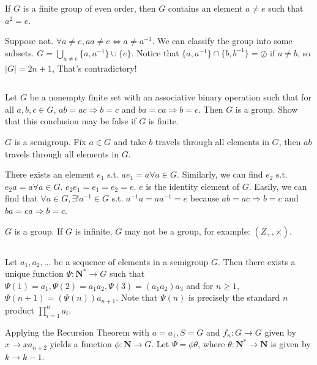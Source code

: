 $$ $$

\begin{ex}
    If $G$ is a finite group of even order, then $G$ contains an element $a\neq e$ such that $a^{2}=e$.
\end{ex}

\begin{answer}
    Suppose not. $\forall a\neq e, aa\neq e \Leftrightarrow a\neq a^{-1}$. We can classify the group into some subsets. $G=\bigcup\limits_{a\neq e}\{a,a^{-1}\}\cup\{e\}$. Notice that $\{a,a^{-1}\}\cap\{b,b^{-1}\}=\oslash$ if $a\neq b$, so $\left| G \right| =2n+1$, That's contradictory!
\end{answer}

$$ $$

\begin{ex}
    Let $G$ be a nonempty finite set with an associative binary operation such that for all $a, b, c\in G$, $ab = ac\Rightarrow b = c$ and $ba  =ca \Rightarrow b = c$. Then $G$ is a group. Show that this conclusion may be false if $G$ is finite.
\end{ex}

\begin{answer}
    $G$ is a semigroup. Fix $a\in G$ and take $b$ travels through all elements in $G$, then $ab$ travels through all elements in $G$.

    There exists an element $e_1$ s.t. $ae_1=a\forall a\in G$. Similarly, we can find $e_2$ s.t. $e_2a=a\forall a\in G$. $e_2e_1=e_1=e_2=e$. $e$ is the identity element of $G$. Easily, we can find that $\forall a\in G, \exists ! a^{-1}\in G$ s.t. $a^{-1}a=aa^{-1}=e$ because $ab = ac\Rightarrow b = c$ and $ba  =ca \Rightarrow b = c$.

    $G$ is a group. If $G$ is infinite, $G$ may not be a group, for example: $(Z_+,\times)$.
\end{answer}

$$ $$

\begin{ex}
    Let $a_1, a_2,\dots$ be a sequence of elements in a semigroup $G$. Then there exists a unique function $\Psi: \mathbf{N^*}\rightarrow G$ such that $\Psi(1)=a_1, \Psi(2)=a_1a_2, \Psi(3)=(a_1a_2)a_3$ and for $n\geq 1$, $\Psi(n+1)=(\Psi(n))a_{n+1}$. Note that $\Psi(n)$ is precisely the standard $n$ product $\prod_{i=1}^na_i$.
\end{ex}

\begin{answer}
    Applying the Recursion Theorem with $a=a_1, S=G$ and $f_n:G\to G$ given by $x\to xa_{n+2}$ yields a function $\phi: \mathbf{N}\to G$. Let $\Psi=\phi\theta$, where $\theta:\mathbf{N^*}\to \mathbf{N}$ is given by $k\to k-1$.
\end{answer}